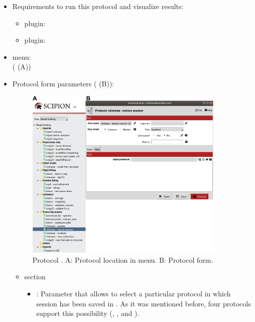  \begin{itemize}
  \item Requirements to run this protocol and visualize results:
    \begin{itemize}
        \item \scipion plugin: 
        \item \scipion plugin: 
    \end{itemize}
  \item \scipion menu:\\
    ( (A))
  
  \item Protocol form parameters ( (B)):
  
    \begin{figure}[H]
     \centering 
     \captionsetup{width=.9\linewidth} 
     \includegraphics[width=0.90\textwidth]{Images_appendix/Fig118.pdf}
     \caption{Protocol . A: Protocol location in \scipion menu. B: Protocol form.}
     \label{fig:app_protocol_chimera_3}
    \end{figure}
    
    \begin{itemize}
     \item {} section

    \begin{itemize}
     \item {}: Parameter that allows to select a particular protocol in which \chimera session has been saved in \scipion. As it was mentioned before, four protocols support this possibility (\chimera {}, \chimera {}, \chimera {} and \chimera {}).
     

\end{itemize}
\end{itemize}
\end{itemize}
